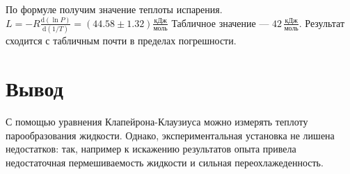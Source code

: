 \documentclass[a4paper,12pt]{article}
\newcommand{\dif}{\mathrm{d}}
\begin{document}
	По формуле получим значение теплоты испарения.
		$L = -R\frac{\dif\left(\ln P\right)}{\dif\left( 1/T \right)} = \left(44.58 \pm 1.32\right)  \frac{\text{кДж}}{\text{моль}}$
		Табличное значение --- $42\, \frac{\text{кДж}}{\text{моль}}$.
		Результат сходится с табличным почти в пределах погрешности.
	\section{Вывод}
	С помощью уравнения Клапейрона-Клаузиуса можно измерять теплоту парообразования жидкости. Однако, экспериментальная установка не лишена недостатков: так, например к искажению результатов опыта привела недостаточная пермешиваемость жидкости и сильная переохлажеденность. 
\end{document}
